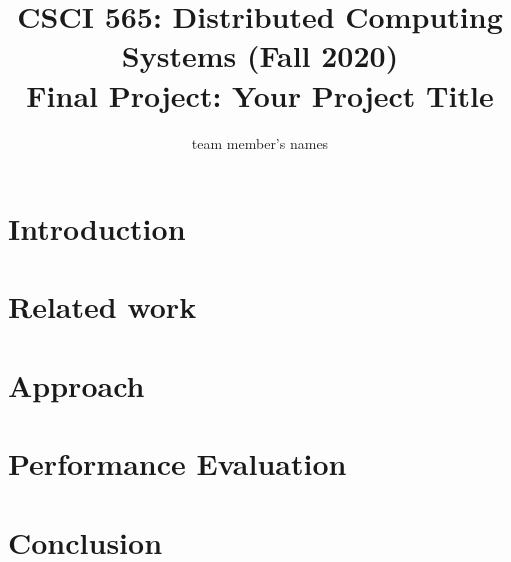\documentclass[11pt]{article}
\title{{\normalsize CSCI 565: Distributed Computing Systems (Fall 2020)}\\Final Project: Your Project Title}
\author{team member's names}
\begin{document}
 
\maketitle

\section{Introduction}
\section{Related work}
   \cite{Konrad2019SimulationOM}

   \cite{Hussein}
  
\section{Approach} %
\section{Performance Evaluation}
    
\section{Conclusion} 



\end{document}
